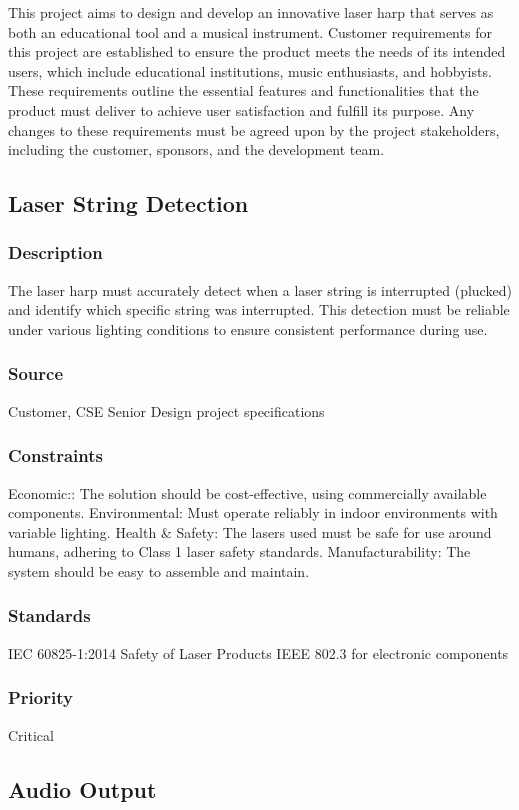 This project aims to design and develop an innovative laser harp that serves as both an educational tool and a musical instrument. Customer requirements for this project are established to ensure the product meets the needs of its intended users, which include educational institutions, music enthusiasts, and hobbyists. These requirements outline the essential features and functionalities that the product must deliver to achieve user satisfaction and fulfill its purpose. Any changes to these requirements must be agreed upon by the project stakeholders, including the customer, sponsors, and the development team.

\subsection{Laser String Detection}
\subsubsection{Description}
The laser harp must accurately detect when a laser string is interrupted (plucked) and identify which specific string was interrupted. This detection must be reliable under various lighting conditions to ensure consistent performance during use.
\subsubsection{Source}
Customer, CSE Senior Design project specifications
\subsubsection{Constraints}
Economic:: The solution should be cost-effective, using commercially available components.
Environmental: Must operate reliably in indoor environments with variable lighting.
Health & Safety: The lasers used must be safe for use around humans, adhering to Class 1 laser safety standards.
Manufacturability: The system should be easy to assemble and maintain.
\subsubsection{Standards}
IEC 60825-1:2014 Safety of Laser Products
IEEE 802.3 for electronic components
\subsubsection{Priority}
Critical


\subsection{Audio Output}
